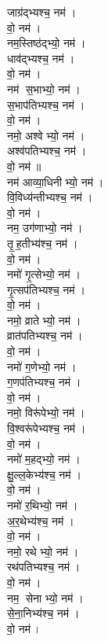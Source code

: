 \begin{multicols}{2}
\begin{flushleft}
जाग्र॑द्भ्यश्च॒  नम॑।\\
 वो॒ नम॑।\hfill {}\\
नम॒स्तिष्ठ॑द्भ्यो॒  नम॑।\\
धाव॑द्भ्यश्च॒  नम॑।\\
 वो॒ नम॑।\\
नम॑ स॒भाभ्यो॒  नम॑।\\
स॒भाप॑तिभ्यश्च॒ नम॑।\\
वो॒ नम॑।\\
नमो॒ अश्वेभ्यो॒  नम॑।\\
अश्व॑पतिभ्यश्च॒  नम॑।\\
वो॒ नम॑॥\\

नम॑ आव्या॒धिनीभ्यो॒  नम॑।\hfill {}\\
वि॒विध्य॑न्तीभ्यश्च॒  नम॑।\\
 वो॒ नम॑।\\
नम॒ उग॑णाभ्यो॒ नम॑।\\
तृ॒ह॒तीभ्य॑श्च॒ नम॑।\\
वो॒ नम॑।\\
नमो॑ गृ॒त्सेभ्यो॒ नम॑।\\
गृ॒त्सप॑तिभ्यश्च॒ नम॑।\\
वो॒ नम॑।\\
नमो॒ व्रातेभ्यो॒ नम॑।\\
व्रात॑पतिभ्यश्च॒ नम॑।\hfill {}\\
वो॒ नम॑।\\
नमो॑ ग॒णेभ्यो॒ नम॑।\\
ग॒णप॑तिभ्यश्च॒ नम॑।\\
वो॒ नम॑।\\
नमो॒ विरू॑पेभ्यो॒ नम॑।\\
वि॒श्वरू॑पेभ्यश्च॒ नम॑।\\
वो॒ नम॑।\\
नमो॑ म॒हद्भ्यो॒ नम॑।\\
क्षु॒ल्ल॒केभ्य॑श्च॒ नम॑।\\
वो॒ नम॑।\hfill {}\\
नमो॑ र॒थिभ्यो॒ नम॑।\\
अ॒र॒थेभ्य॑श्च॒ नम॑।\\
वो॒ नम॑।\\
नमो॒ रथेभ्यो॒ नम॑।\\
रथ॑पतिभ्यश्च॒ नम॑।\\
वो॒ नम॑।\\
नम॒ सेनाभ्यो॒ नम॑।\\
से॒ना॒निभ्य॑श्च॒ नम॑।\\
वो॒ नम॑।\\

\end{flushleft}
\end{multicols}
